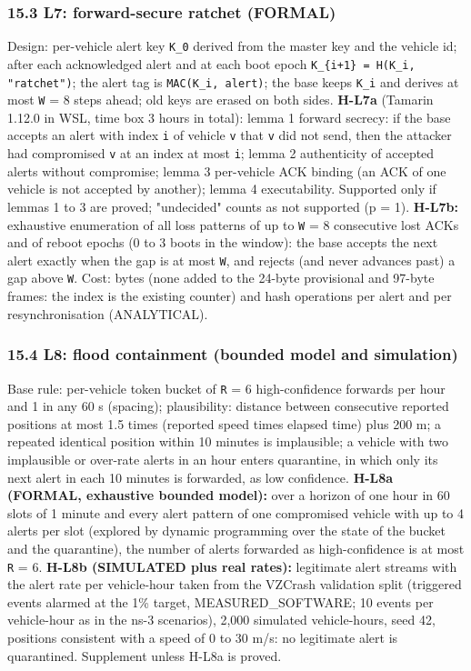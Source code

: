 \subsubsection*{15.3 L7: forward-secure ratchet (FORMAL)}

Design: per-vehicle alert key \texttt{K\_0} derived from the master key and the vehicle id; after each acknowledged alert and at each boot epoch \texttt{K\_\{i+1\} = H(K\_i, "ratchet")}; the alert tag is \texttt{MAC(K\_i, alert)}; the base keeps \texttt{K\_i} and derives at most \texttt{W} = 8 steps ahead; old keys are erased on both sides. \textbf{H-L7a} (Tamarin 1.12.0 in WSL, time box 3 hours in total): lemma 1 forward secrecy: if the base accepts an alert with index \texttt{i} of vehicle \texttt{v} that \texttt{v} did not send, then the attacker had compromised \texttt{v} at an index at most \texttt{i}; lemma 2 authenticity of accepted alerts without compromise; lemma 3 per-vehicle ACK binding (an ACK of one vehicle is not accepted by another); lemma 4 executability. Supported only if lemmas 1 to 3 are proved; "undecided" counts as not supported (p = 1). \textbf{H-L7b:} exhaustive enumeration of all loss patterns of up to \texttt{W} = 8 consecutive lost ACKs and of reboot epochs (0 to 3 boots in the window): the base accepts the next alert exactly when the gap is at most \texttt{W}, and rejects (and never advances past) a gap above \texttt{W}. Cost: bytes (none added to the 24-byte provisional and 97-byte frames: the index is the existing counter) and hash operations per alert and per resynchronisation (ANALYTICAL).

\subsubsection*{15.4 L8: flood containment (bounded model and simulation)}

Base rule: per-vehicle token bucket of \texttt{R} = 6 high-confidence forwards per hour and 1 in any 60 s (spacing); plausibility: distance between consecutive reported positions at most 1.5 times (reported speed times elapsed time) plus 200 m; a repeated identical position within 10 minutes is implausible; a vehicle with two implausible or over-rate alerts in an hour enters quarantine, in which only its next alert in each 10 minutes is forwarded, as low confidence. \textbf{H-L8a (FORMAL, exhaustive bounded model):} over a horizon of one hour in 60 slots of 1 minute and every alert pattern of one compromised vehicle with up to 4 alerts per slot (explored by dynamic programming over the state of the bucket and the quarantine), the number of alerts forwarded as high-confidence is at most \texttt{R} = 6. \textbf{H-L8b (SIMULATED plus real rates):} legitimate alert streams with the alert rate per vehicle-hour taken from the VZCrash validation split (triggered events alarmed at the 1\% target, MEASURED\_SOFTWARE; 10 events per vehicle-hour as in the ns-3 scenarios), 2,000 simulated vehicle-hours, seed 42, positions consistent with a speed of 0 to 30 m/s: no legitimate alert is quarantined. Supplement unless H-L8a is proved.

